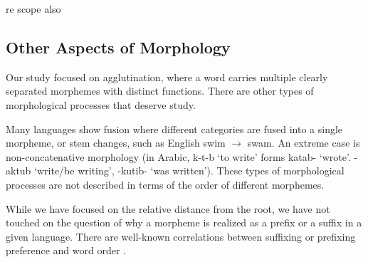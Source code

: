 \documentclass[11pt,letterpaper]{article}
\newcommand{\citep}{\parencite}
\begin{document}
re scope also \cite{alsina1999where}






\cite{aronoff2010a} %













\subsection{Other Aspects of Morphology}

Our study focused on agglutination, where a word carries multiple clearly separated morphemes with distinct functions.
There are other types of morphological processes that deserve study.

Many languages show fusion where different categories are fused into a single morpheme, or stem changes, such as English swim $\rightarrow$ swam.
An extreme case is non-concatenative morphology (in Arabic, k-t-b `to write' forms katab- `wrote'. -aktub `write/be writing', -kutib- `was written').
These types of morphological processes are not described in terms of the order of different morphemes.


While we have focused on the relative distance from the root, we have not touched on the question of why a morpheme is realized as a prefix or a suffix in a given language.
There are well-known correlations between suffixing or prefixing preference and word order \citep{greenberg1963universals}.
\end{document}
